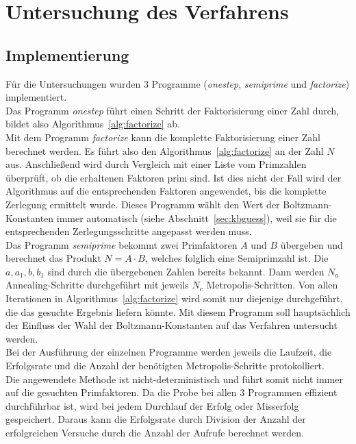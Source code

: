 \chapter{Untersuchung des Verfahrens}\label{ch:results}



\section{Implementierung}
Für die Untersuchungen wurden $3$ Programme (\textit{onestep}, \textit{semiprime} und \textit{factorize}) implementiert.  \\
Das Programm \textit{onestep} führt einen Schritt der Faktorisierung einer Zahl durch, bildet also Algorithmus~\ref{alg:factorize} ab. \\
Mit dem Programm \textit{factorize} kann die komplette Faktorisierung einer Zahl berechnet werden. Es führt also den Algorithmus~\ref{alg:factorize} an der Zahl $N$ aus. Anschließend wird durch Vergleich mit einer Liste vom Primzahlen überprüft, ob die erhaltenen Faktoren prim sind. Ist dies nicht der Fall wird der Algorithmus auf die entsprechenden Faktoren angewendet, bis die komplette Zerlegung ermittelt wurde. Dieses Programm wählt den Wert der Boltzmann-Konstanten immer automatisch (siehe Abschnitt~\ref{sec:kbguess}), weil sie für die entsprechenden Zerlegungsschritte angepasst werden muss.\\
Das Programm \textit{semiprime} bekommt zwei Primfaktoren $A$ und $B$ übergeben und berechnet das Produkt $N=A\cdot B$, welches folglich eine Semiprimzahl ist. Die $a, a_1, b, b_1$ sind durch die übergebenen Zahlen bereits bekannt. Dann werden $N_a$ Annealing-Schritte durchgeführt mit jeweils $N_c$ Metropolis-Schritten. Von allen Iterationen in Algorithmus~\ref{alg:factorize} wird somit nur diejenige durchgeführt, die das gesuchte Ergebnis liefern könnte. Mit diesem Programm soll hauptsächlich der Einfluss der Wahl der Boltzmann-Konstanten auf das Verfahren untersucht werden. \\
Bei der Ausführung der einzelnen Programme werden jeweils die Laufzeit, die Erfolgsrate und die Anzahl der benötigten Metropolis-Schritte protokolliert. \\
Die angewendete Methode ist nicht-deterministisch und führt somit nicht immer auf die gesuchten Primfaktoren. Da die Probe bei allen $3$ Programmen effizient durchführbar ist, wird bei jedem Durchlauf der Erfolg oder Misserfolg gespeichert. Daraus kann die Erfolgsrate durch Division der Anzahl der erfolgreichen Versuche durch die Anzahl der Aufrufe berechnet werden. \\

